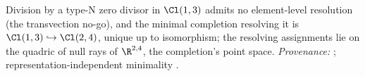Division by a type-N zero divisor in $\Cl(1,3)$ admits no element-level resolution (the transvection no-go), and the minimal completion resolving it is $\Cl(1,3) \hookrightarrow \Cl(2,4)$, unique up to isomorphism; the resolving assignments lie on the quadric of null rays of $\R^{2,4}$, the completion's point space. \emph{Provenance:} \cite[Thms.~4.2, 4.10, 4.13]{ButlerT1}; representation-independent minimality \cite[\S4.6]{ButlerT1}.
